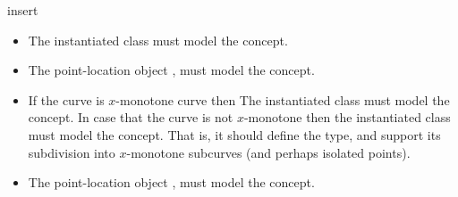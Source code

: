 \begin{ccRefFunction}{insert}
\ccRequirements
\begin{itemize}
\item The instantiated  class must model the
   concept.
\item The point-location object , must model the
   concept.
\end{itemize}
			

\ccRequirements
\begin{itemize}
\item If the curve is $x$-monotone curve then The instantiated
   class must model the 
  concept. In case that the curve is not $x$-monotone then the
  instantiated  class must model the
   concept. That is, it should define the
   type, and support its subdivision into $x$-monotone
  subcurves (and perhaps isolated points). 
\item The point-location object , must model the
   concept.
\end{itemize}

\end{ccRefFunction}

\ccRefPageEnd
